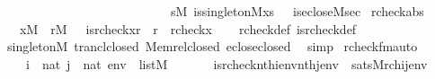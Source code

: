 \begin{isabellebody}
\ \ \ \ \ \ \ \ \ \ \ \ \ \ \ \ \ \ \ \ \ \ \ \ \ \ \ {\isacharparenleft}{\kern0pt}{\isasymexists}s{\isasymin}M{\isachardot}{\kern0pt}\ is{\isacharunderscore}{\kern0pt}singleton{\isacharparenleft}{\kern0pt}{\isacharhash}{\kern0pt}{\isacharhash}{\kern0pt}M{\isacharcomma}{\kern0pt}x{\isacharcomma}{\kern0pt}s{\isacharparenright}{\kern0pt}\ {\isasymand}\ \ is{\isacharunderscore}{\kern0pt}eclose{\isacharparenleft}{\kern0pt}{\isacharhash}{\kern0pt}{\isacharhash}{\kern0pt}M{\isacharcomma}{\kern0pt}s{\isacharcomma}{\kern0pt}ec{\isacharparenright}{\kern0pt}{\isacharparenright}{\kern0pt}{\isacharparenright}{\kern0pt}{\isachardoublequoteclose}\isanewline
\isanewline
{}\isamarkupfalse%
\ rcheck{\isacharunderscore}{\kern0pt}abs\ {\isacharcolon}{\kern0pt}\isanewline
\ \ {\isachardoublequoteopen}{\isasymlbrakk}\ x{\isasymin}M\ {\isacharsemicolon}{\kern0pt}\ r{\isasymin}M\ {\isasymrbrakk}\ {\isasymLongrightarrow}\ is{\isacharunderscore}{\kern0pt}rcheck{\isacharparenleft}{\kern0pt}x{\isacharcomma}{\kern0pt}r{\isacharparenright}{\kern0pt}\ {\isasymlongleftrightarrow}\ r\ {\isacharequal}{\kern0pt}\ rcheck{\isacharparenleft}{\kern0pt}x{\isacharparenright}{\kern0pt}{\isachardoublequoteclose}\isanewline
%
\isadelimproof
\ \ %
\endisadelimproof
%
\isatagproof
{}\isamarkupfalse%
\ rcheck{\isacharunderscore}{\kern0pt}def\ is{\isacharunderscore}{\kern0pt}rcheck{\isacharunderscore}{\kern0pt}def\isanewline
\ \ \isamarkupfalse%
\ singletonM\ trancl{\isacharunderscore}{\kern0pt}closed\ Memrel{\isacharunderscore}{\kern0pt}closed\ eclose{\isacharunderscore}{\kern0pt}closed\ \isamarkupfalse%
\ simp%
\endisatagproof
{\isafoldproof}%
%
\isadelimproof
\isanewline
%
\endisadelimproof
\isanewline
{}\isamarkupfalse%
\ rcheck{\isacharunderscore}{\kern0pt}fm{\isacharunderscore}{\kern0pt}auto{\isacharcolon}{\kern0pt}\isanewline
\ \ \isanewline
\ \ \ \ {\isachardoublequoteopen}i\ {\isasymin}\ nat{\isachardoublequoteclose}\ {\isachardoublequoteopen}j\ {\isasymin}\ nat{\isachardoublequoteclose}\ {\isachardoublequoteopen}env\ {\isasymin}\ list{\isacharparenleft}{\kern0pt}M{\isacharparenright}{\kern0pt}{\isachardoublequoteclose}\isanewline
\ \ \isanewline
\ \ \ \ {\isachardoublequoteopen}is{\isacharunderscore}{\kern0pt}rcheck{\isacharparenleft}{\kern0pt}nth{\isacharparenleft}{\kern0pt}i{\isacharcomma}{\kern0pt}env{\isacharparenright}{\kern0pt}{\isacharcomma}{\kern0pt}nth{\isacharparenleft}{\kern0pt}j{\isacharcomma}{\kern0pt}env{\isacharparenright}{\kern0pt}{\isacharparenright}{\kern0pt}\ {\isasymlongleftrightarrow}\ sats{\isacharparenleft}{\kern0pt}M{\isacharcomma}{\kern0pt}{\isacharquery}{\kern0pt}rch{\isacharparenleft}{\kern0pt}i{\isacharcomma}{\kern0pt}j{\isacharparenright}{\kern0pt}{\isacharcomma}{\kern0pt}env{\isacharparenright}{\kern0pt}{\isachardoublequoteclose}\isanewline

\end{isabellebody}
